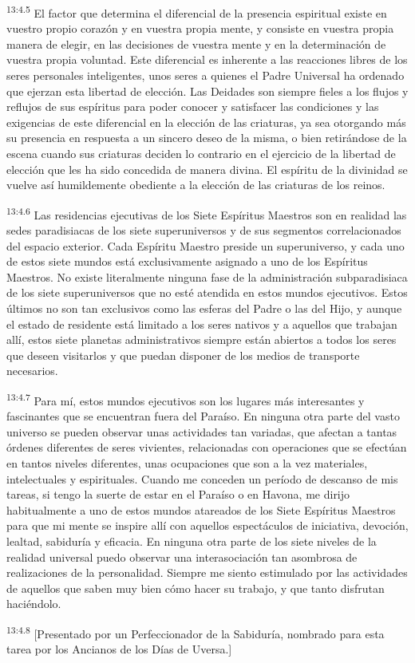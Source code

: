 \par
\textsuperscript{13:4.5} El factor que determina el diferencial de la presencia espiritual existe en vuestro propio corazón y en vuestra propia mente, y consiste en vuestra propia manera de elegir, en las decisiones de vuestra mente y en la determinación de vuestra propia voluntad. Este diferencial es inherente a las reacciones libres de los seres personales inteligentes, unos seres a quienes el Padre Universal ha ordenado que ejerzan esta libertad de elección. Las Deidades son siempre fieles a los flujos y reflujos de sus espíritus para poder conocer y satisfacer las condiciones y las exigencias de este diferencial en la elección de las criaturas, ya sea otorgando más su presencia en respuesta a un sincero deseo de la misma, o bien retirándose de la escena cuando sus criaturas deciden lo contrario en el ejercicio de la libertad de elección que les ha sido concedida de manera divina. El espíritu de la divinidad se vuelve así humildemente obediente a la elección de las criaturas de los reinos.

\par
\textsuperscript{13:4.6} Las residencias ejecutivas de los Siete Espíritus Maestros son en realidad las sedes paradisiacas de los siete superuniversos y de sus segmentos correlacionados del espacio exterior. Cada Espíritu Maestro preside un superuniverso, y cada uno de estos siete mundos está exclusivamente asignado a uno de los Espíritus Maestros. No existe literalmente ninguna fase de la administración subparadisiaca de los siete superuniversos que no esté atendida en estos mundos ejecutivos. Estos últimos no son tan exclusivos como las esferas del Padre o las del Hijo, y aunque el estado de residente está limitado a los seres nativos y a aquellos que trabajan allí, estos siete planetas administrativos siempre están abiertos a todos los seres que deseen visitarlos y que puedan disponer de los medios de transporte necesarios.

\par
\textsuperscript{13:4.7} Para mí, estos mundos ejecutivos son los lugares más interesantes y fascinantes que se encuentran fuera del Paraíso. En ninguna otra parte del vasto universo se pueden observar unas actividades tan variadas, que afectan a tantas órdenes diferentes de seres vivientes, relacionadas con operaciones que se efectúan en tantos niveles diferentes, unas ocupaciones que son a la vez materiales, intelectuales y espirituales. Cuando me conceden un período de descanso de mis tareas, si tengo la suerte de estar en el Paraíso o en Havona, me dirijo habitualmente a uno de estos mundos atareados de los Siete Espíritus Maestros para que mi mente se inspire allí con aquellos espectáculos de iniciativa, devoción, lealtad, sabiduría y eficacia. En ninguna otra parte de los siete niveles de la realidad universal puedo observar una interasociación tan asombrosa de realizaciones de la personalidad. Siempre me siento estimulado por las actividades de aquellos que saben muy bien cómo hacer su trabajo, y que tanto disfrutan haciéndolo.

\par
\textsuperscript{13:4.8} [Presentado por un Perfeccionador de la Sabiduría, nombrado para esta tarea por los Ancianos de los Días de Uversa.]
